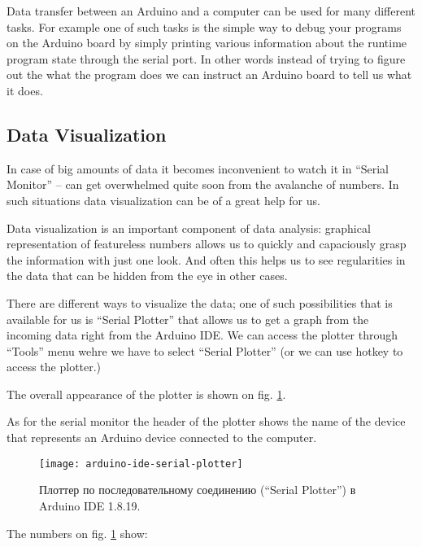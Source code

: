 \documentclass[../sparc.tex]{subfiles}
\begin{document}
Data transfer between an Arduino and a computer can be used for many different
tasks.  For example one of such tasks is the simple way to debug your programs
on the Arduino board by simply printing various information about the runtime
program state through the serial port.  In other words instead of trying to
figure out the what the program does we can instruct an Arduino board to tell us
what it does.

\subsection{Data Visualization}

In case of big amounts of data it becomes inconvenient to watch it in ``Serial
Monitor'' -- can get overwhelmed quite soon from the avalanche of numbers.  In
such situations data visualization can be of a great help for us.

Data visualization is an important component of data analysis: graphical
representation of featureless numbers allows us to quickly and capaciously grasp
the information with just one look.  And often this helps us to see regularities
in the data that can be hidden from the eye in other cases.

There are different ways to visualize the data; one of such possibilities that
is available for us is ``Serial Plotter'' that allows us to get a graph from the
incoming data right from the Arduino IDE.  We can access the plotter through
``Tools'' menu wehre we have to select ``Serial Plotter'' (or we can use
 hotkey to access the plotter.)

The overall appearance of the plotter is shown on
fig. \ref{fig:arduino-ide-serial-plotter}.

As for the serial monitor the header of the plotter shows the name of the device
that represents an Arduino device connected to the computer.

\begin{figure}[ht]
  \centering
  \texttt{[image: arduino-ide-serial-plotter]}
  \caption{Плоттер по последовательному соединению (``Serial Plotter'') в
    Arduino IDE 1.8.19.}
  \label{fig:arduino-ide-serial-plotter}
\end{figure}

The numbers on fig. \ref{fig:arduino-ide-serial-plotter} show:
\end{document}
